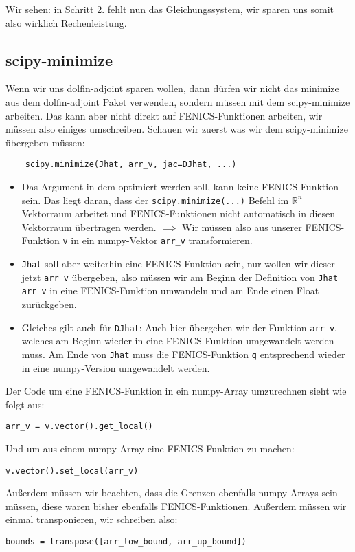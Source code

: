 \documentclass[a4paper, 12pt]{scrartcl}
\begin{document}
Wir sehen: in Schritt 2. fehlt nun das Gleichungssystem, wir sparen uns somit also wirklich Rechenleistung.


\subsection{scipy-minimize}
Wenn wir uns dolfin-adjoint sparen wollen, dann dürfen wir nicht das minimize aus dem dolfin-adjoint Paket verwenden, sondern müssen mit dem scipy-minimize arbeiten. Das kann aber nicht direkt auf FENICS-Funktionen arbeiten, wir müssen also einiges umschreiben. Schauen wir zuerst was wir dem scipy-minimize übergeben müssen:
\begin{verbatim}
	scipy.minimize(Jhat, arr_v, jac=DJhat, ...)
\end{verbatim}
\begin{itemize}
	\item Das Argument in dem optimiert werden soll, kann keine FENICS-Funktion sein. Das liegt daran, dass der \verb|scipy.minimize(...)| Befehl im $\mathbb{R}^n$ Vektorraum arbeitet und FENICS-Funktionen nicht automatisch in diesen Vektorraum übertragen werden. $\implies$ Wir müssen also aus unserer FENICS-Funktion \verb|v| in ein numpy-Vektor \verb|arr_v| transformieren.
	\item \verb|Jhat| soll aber weiterhin eine FENICS-Funktion sein, nur wollen wir dieser jetzt \verb|arr_v| übergeben, also müssen wir am Beginn der Definition von \verb|Jhat| \verb|arr_v| in eine FENICS-Funktion umwandeln und am Ende einen Float zurückgeben.
	\item Gleiches gilt auch für \verb|DJhat|: Auch hier übergeben wir der Funktion \verb|arr_v|, welches am Beginn wieder in eine FENICS-Funktion umgewandelt werden muss. Am Ende von \verb|Jhat| muss die FENICS-Funktion \verb|g| entsprechend wieder in eine numpy-Version umgewandelt werden.
\end{itemize}
Der Code um eine FENICS-Funktion in ein numpy-Array umzurechnen sieht wie folgt aus:
\begin{verbatim}
arr_v = v.vector().get_local()
\end{verbatim}
Und um aus einem numpy-Array eine FENICS-Funktion zu machen:
\begin{verbatim}
v.vector().set_local(arr_v)
\end{verbatim}
Außerdem müssen wir beachten, dass die Grenzen ebenfalls numpy-Arrays sein müssen, diese waren bisher ebenfalls FENICS-Funktionen. Außerdem müssen wir einmal transponieren, wir schreiben also:
\begin{verbatim}
bounds = transpose([arr_low_bound, arr_up_bound])
\end{verbatim}
\end{document}
